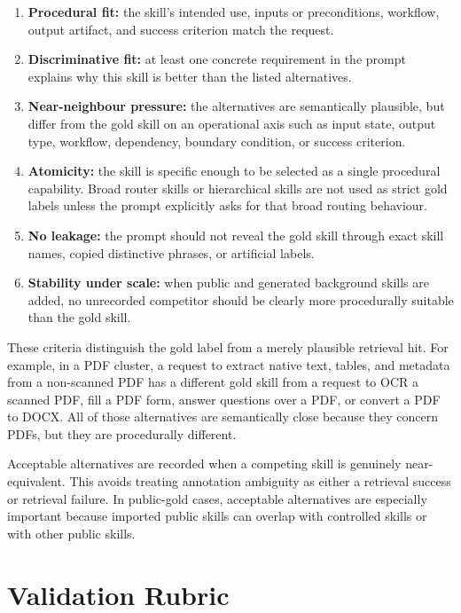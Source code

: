 \begin{enumerate}
  \item \textbf{Procedural fit:} the skill's intended use, inputs or preconditions, workflow, output artifact, and success criterion match the request.
  \item \textbf{Discriminative fit:} at least one concrete requirement in the prompt explains why this skill is better than the listed alternatives.
  \item \textbf{Near-neighbour pressure:} the alternatives are semantically plausible, but differ from the gold skill on an operational axis such as input state, output type, workflow, dependency, boundary condition, or success criterion.
  \item \textbf{Atomicity:} the skill is specific enough to be selected as a single procedural capability. Broad router skills or hierarchical skills are not used as strict gold labels unless the prompt explicitly asks for that broad routing behaviour.
  \item \textbf{No leakage:} the prompt should not reveal the gold skill through exact skill names, copied distinctive phrases, or artificial labels.
  \item \textbf{Stability under scale:} when public and generated background skills are added, no unrecorded competitor should be clearly more procedurally suitable than the gold skill.
\end{enumerate}

These criteria distinguish the gold label from a merely plausible retrieval hit. For example, in a PDF cluster, a request to extract native text, tables, and metadata from a non-scanned PDF has a different gold skill from a request to OCR a scanned PDF, fill a PDF form, answer questions over a PDF, or convert a PDF to DOCX. All of those alternatives are semantically close because they concern PDFs, but they are procedurally different.

Acceptable alternatives are recorded when a competing skill is genuinely near-equivalent. This avoids treating annotation ambiguity as either a retrieval success or retrieval failure. In public-gold cases, acceptable alternatives are especially important because imported public skills can overlap with controlled skills or with other public skills.

\section{Validation Rubric}

